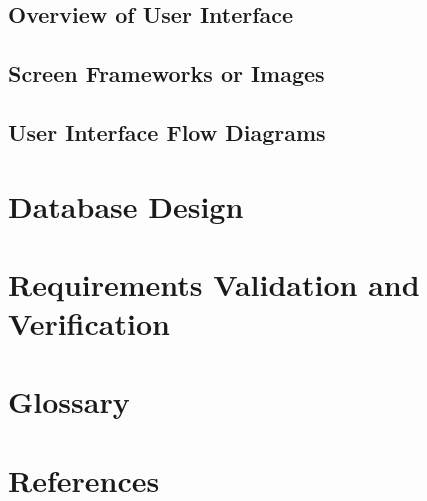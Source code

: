 \documentclass[11pt]{article}
\begin{document}
\subsection{Overview of User Interface}
\label{sec:overviewui}

\subsection{Screen Frameworks or Images}
\label{sec:frameworks}

\subsection{User Interface Flow Diagrams}
\label{sec:flowdiagrams}

\section{Database Design}
\label{sec:database}

\section{Requirements Validation and Verification}
\label{sec:validation}

\section{Glossary}
\label{sec:glossary}

\section{References}
\label{sec:references}

\end{document}
